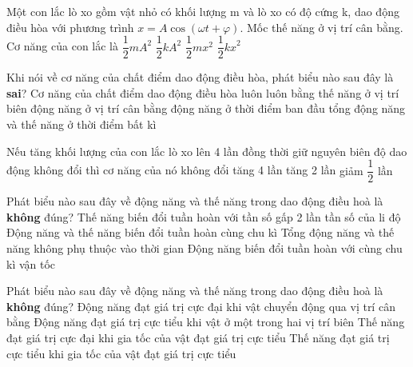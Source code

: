 \begin{ex}%
Một con lắc lò xo gồm vật nhỏ có khối lượng m và lò xo có độ cứng k, dao động điều hòa với phương trình $x=A\cos \left({\omega t+\varphi }\right)$. Mốc thế năng ở vị trí cân bằng. Cơ năng của con lắc là
\choice
{$\dfrac{1}{2}{mA}^2$}
{\True $\dfrac{1}{2}{kA}^2$}
{$\dfrac{1}{2}{mx}^2$}
{$\dfrac{1}{2}{kx}^2$}
\end{ex} 
\begin{ex}%
Khi nói về cơ năng của chất điểm dao động điều hòa, phát biểu nào sau đây là \textbf{sai}? Cơ năng của chất điểm dao động điều hòa luôn luôn bằng
\choice
{thế năng ở vị trí biên}
{động năng ở vị trí cân bằng}
{\True động năng ở thời điểm ban đầu}
{tổng động năng và thế năng ở thời điểm bất kì}
\end{ex} 
\begin{ex}%
Nếu tăng khối lượng của con lắc lò xo lên 4 lần đồng thời giữ nguyên biên độ dao động không đổi thì cơ năng của nó
\choice
{\True không đổi}
{tăng 4 lần}
{tăng 2 lần}
{giảm $\dfrac{1}{2}$ lần}
\end{ex} 
\begin{ex}%
Phát biểu nào sau đây về động năng và thế năng trong dao động điều hoà là \textbf{không} đúng?
\choice
{Thế năng biến đổi tuần hoàn với tần số gấp 2 lần tần số của li độ}
{Động năng và thế năng biến đổi tuần hoàn cùng chu kì}
{Tổng động năng và thế năng không phụ thuộc vào thời gian}
{\True Động năng biến đổi tuần hoàn với cùng chu kì vận tốc}
\end{ex} 
\begin{ex}%
Phát biểu nào sau đây về động năng và thế năng trong dao động điều hoà là \textbf{không} đúng?
\choice
{Động năng đạt giá trị cực đại khi vật chuyển động qua vị trí cân bằng}
{Động năng đạt giá trị cực tiểu khi vật ở một trong hai vị trí biên}
{Thế năng đạt giá trị cực đại khi gia tốc của vật đạt giá trị cực tiểu}
{\True Thế năng đạt giá trị cực tiểu khi gia tốc của vật đạt giá trị cực tiểu}
\end{ex} 
